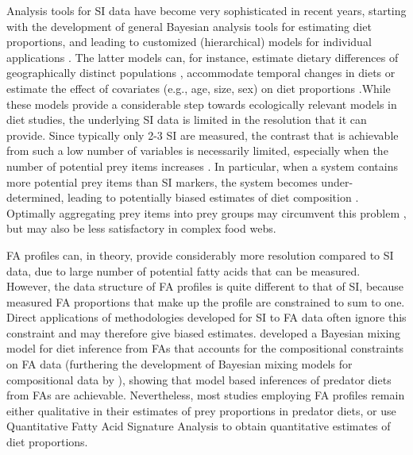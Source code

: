 \documentclass[fleqn,10pt]{wlpeerj}
\begin{document}
Analysis tools for SI data have become very sophisticated in recent
years, starting with the development of general Bayesian analysis
tools for estimating diet proportions, and leading to customized
(hierarchical) models for individual applications \citep{moore_incorporating_2008,hopkins_estimating_2012,parnell_bayesian_2012}. The latter models
can, for instance, estimate dietary differences of geographically
distinct populations \citep{semmens_quantifying_2009}, accommodate temporal
changes in diets or estimate the effect of covariates (e.g., age,
size, sex) on diet proportions \citep{parnell_bayesian_2012}.While these
models provide a considerable step towards ecologically relevant
models in diet studies, the underlying SI data is limited in the
resolution that it can provide. Since typically only 2-3 SI are
measured, the contrast that is achievable from such a low number of
variables is necessarily limited, especially when the number of
potential prey items increases \citep{phillips_source_2003,ward_quantitative_2011}. In particular, when a system contains more potential prey items than SI markers, the system becomes under-determined, leading to potentially biased estimates of diet composition \citep{ phillips_source_2003, fry_alternative_2013,semmens_statistical_2013,fry_minmax_2013, brett_resource_2014}. Optimally aggregating prey items into prey groups may
circumvent this problem \citep{ward_quantitative_2011}, but may also be less
satisfactory in complex food webs.

FA profiles can, in theory, provide considerably more resolution compared
to SI data, due to large number of potential fatty acids that can be
measured. However, the data structure of FA profiles is quite different to that of SI, because measured FA proportions that make up the profile are constrained to sum to one. Direct applications of methodologies developed for SI to FA data often ignore this constraint and may therefore give biased estimates. \citet{blanchard_inference_2011} developed a
Bayesian mixing model for diet inference from FAs that accounts for the compositional constraints on FA data (furthering the
development of Bayesian mixing models for compositional data by
\citet{billheimer_compositional_2001}), showing that model based
inferences of predator diets from FAs are
achievable. Nevertheless, most studies employing FA profiles remain either qualitative
in their estimates of prey proportions in predator diets, or use
Quantitative Fatty Acid Signature Analysis \citep[QFASA; ][]{iverson_quantitative_2004} to
obtain quantitative estimates of diet proportions. 
\end{document}
